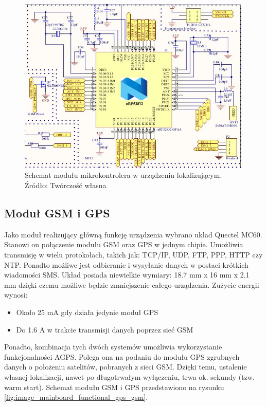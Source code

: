 \begin{figure}[H]
	\centering
	\includegraphics[width=15cm]{img/schematics/mainboard_functional_mcu.jpg}
	\caption{Schemat modułu mikrokontrolera w urządzeniu lokalizującym. \\ Źródło: Twórczość własna}
	\label{fig:image_mainboard_functional_mcu}
\end{figure}

\subsection{Moduł GSM i GPS}

Jako moduł realizujący główną funkcję urządzenia wybrano układ Quectel MC60. Stanowi on połączenie modułu GSM oraz GPS w jednym chipie. Umożliwia transmisję w wielu protokołach, takich jak: TCP/IP, UDP, FTP, PPP, HTTP czy NTP. Ponadto możliwe jest odbieranie i wysyłanie danych w postaci krótkich wiadomości SMS. Układ posiada niewielkie wymiary: 18.7 mm x 16 mm x 2.1 mm dzięki czemu możliwe będzie zmniejszenie całego urządzenia. Zużycie energii wynosi:
\begin{itemize}
\item Około 25 mA gdy działa jedynie moduł GPS
\item Do 1.6 A w trakcie transmisji danych poprzez sieć GSM
\end{itemize}

Ponadto, kombinacja tych dwóch systemów umożliwia wykorzystanie funkcjonalności AGPS. Polega ona na podaniu do modułu GPS zgrubnych danych o położeniu satelitów, pobranych z sieci GSM. Dzięki temu, ustalenie własnej lokalizacji, nawet po długotrwałym wyłączeniu, trwa ok. sekundy (tzw. warm start). Schemat modułu GSM i GPS przedstawiono na rysunku \ref{fig:image_mainboard_functional_gps_gsm}.

